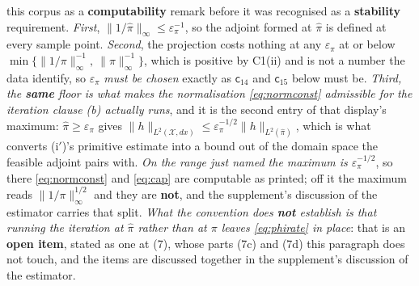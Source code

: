 \begin{definition}
{this corpus as a \textbf{computability} remark before it was recognised as a \textbf{stability}
requirement}. \emph{First}, $\|1/\hat\pi\|_\infty\le\varepsilon_\pi^{-1}$, so the adjoint
 formed at $\hat\pi$ is defined at every sample point. \emph{Second}, the projection
costs nothing at any $\varepsilon_\pi$ at or below
$\min\big\{\|1/\pi\|_\infty^{-1},\ \|\pi\|_\infty^{-1}\big\}$, which is positive by C1(ii) and is not a
number the data identify, so $\varepsilon_\pi$ \emph{must be chosen} exactly as $\mathsf c_{14}$ and
$\mathsf c_{15}$ below must be. \emph{Third, the \textbf{same} floor is what makes the normalisation
\eqref{eq:normconst} admissible for the iteration clause \textup{(b)} actually runs}, and it is the
second entry of that display's maximum: $\hat\pi\ge\varepsilon_\pi$ gives
$\|h\|_{L^{2}(\mathcal X,dx)}\le\varepsilon_\pi^{-1/2}\|h\|_{L^{2}(\hat\pi)}$, which is what converts
\textup{(i$'$)}'s primitive estimate into a bound out of the domain space
the feasible adjoint pairs with. \emph{On the range just named the maximum is $\varepsilon_\pi^{-1/2}$},
so there \eqref{eq:normconst} and \eqref{eq:cap} are computable as printed; off it the maximum reads
$\|1/\pi\|_\infty^{1/2}$ and they are \textbf{not}, and the supplement's discussion of the estimator
carries that split. \emph{What the convention does \textbf{not} establish is that running
the iteration at $\hat\pi$ rather than at $\pi$ leaves \eqref{eq:phirate} in place}: that is an
\textbf{open item}, stated as one at \textup{(7)}, whose parts
\textup{(7c)} and \textup{(7d)} this paragraph does not touch, and the items are
discussed together in the supplement's discussion of the estimator.

\end{definition}
